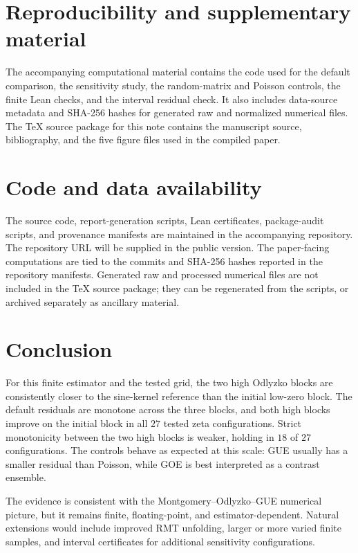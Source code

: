 \documentclass[11pt]{article}
\begin{document}
\section{Reproducibility and supplementary material}

The accompanying computational material contains the code used for the default comparison, the sensitivity study, the random-matrix and Poisson controls, the finite Lean checks, and the interval residual check.  It also includes data-source metadata and SHA-256 hashes for generated raw and normalized numerical files.  The \TeX{} source package for this note contains the manuscript source, bibliography, and the five figure files used in the compiled paper.

\section{Code and data availability}

The source code, report-generation scripts, Lean certificates, package-audit scripts, and provenance manifests are maintained in the accompanying repository.  The repository URL will be supplied in the public version.
The paper-facing computations are tied to the commits and SHA-256 hashes reported in the repository manifests.  Generated raw and processed numerical files are not included in the \TeX{} source package; they can be regenerated from the scripts, or archived separately as ancillary material.

\section{Conclusion}

For this finite estimator and the tested grid, the two high Odlyzko blocks are consistently closer to the sine-kernel reference than the initial low-zero block.  The default residuals are monotone across the three blocks, and both high blocks improve on the initial block in all $27$ tested zeta configurations.  Strict monotonicity between the two high blocks is weaker, holding in $18$ of $27$ configurations.  The controls behave as expected at this scale: GUE usually has a smaller residual than Poisson, while GOE is best interpreted as a contrast ensemble.

The evidence is consistent with the Montgomery--Odlyzko--GUE numerical picture, but it remains finite, floating-point, and estimator-dependent.  Natural extensions would include improved RMT unfolding, larger or more varied finite samples, and interval certificates for additional sensitivity configurations.



\end{document}
